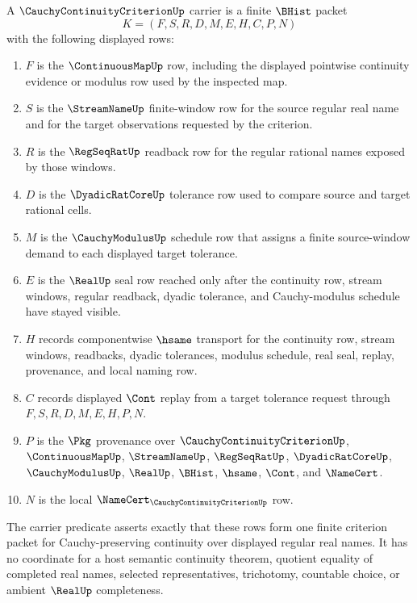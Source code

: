 \begin{definition}
\label{def:cauchy-continuity-criterion-carrier}
A $\CauchyContinuityCriterionUp$ carrier is a finite $\BHist$ packet
$$
K=(F,S,R,D,M,E,H,C,P,N)
$$
with the following displayed rows:
\begin{enumerate}
\item $F$ is the $\ContinuousMapUp$ row, including the displayed pointwise continuity evidence or modulus row used by the inspected map.
\item $S$ is the $\StreamNameUp$ finite-window row for the source regular real name and for the target observations requested by the criterion.
\item $R$ is the $\RegSeqRatUp$ readback row for the regular rational names exposed by those windows.
\item $D$ is the $\DyadicRatCoreUp$ tolerance row used to compare source and target rational cells.
\item $M$ is the $\CauchyModulusUp$ schedule row that assigns a finite source-window demand to each displayed target tolerance.
\item $E$ is the $\RealUp$ seal row reached only after the continuity row, stream windows, regular readback, dyadic tolerance, and Cauchy-modulus schedule have stayed visible.
\item $H$ records componentwise $\hsame$ transport for the continuity row, stream windows, readbacks, dyadic tolerances, modulus schedule, real seal, replay, provenance, and local naming row.
\item $C$ records displayed $\Cont$ replay from a target tolerance request through $F,S,R,D,M,E,H,P,N$.
\item $P$ is the $\Pkg$ provenance over $\CauchyContinuityCriterionUp$, $\ContinuousMapUp$, $\StreamNameUp$, $\RegSeqRatUp$, $\DyadicRatCoreUp$, $\CauchyModulusUp$, $\RealUp$, $\BHist$, $\hsame$, $\Cont$, and $\NameCert$.
\item $N$ is the local $\NameCert_{\CauchyContinuityCriterionUp}$ row.
\end{enumerate}
The carrier predicate asserts exactly that these rows form one finite criterion packet for Cauchy-preserving continuity over displayed regular real names. It has no coordinate for a host semantic continuity theorem, quotient equality of completed real names, selected representatives, trichotomy, countable choice, or ambient $\RealUp$ completeness.
\end{definition}

